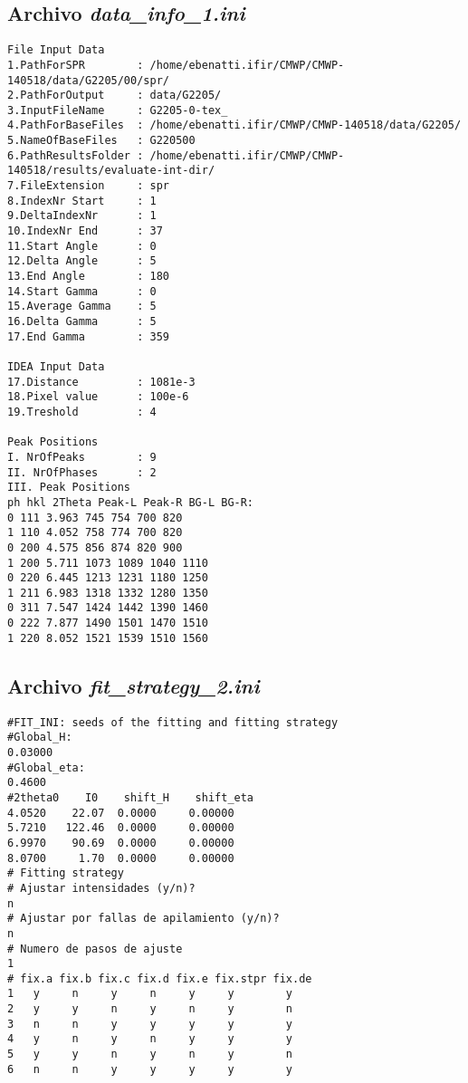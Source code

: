 \subsection{Archivo \textit{data\_info\_1.ini}}
\begin{lstlisting}
File Input Data
1.PathForSPR        : /home/ebenatti.ifir/CMWP/CMWP-140518/data/G2205/00/spr/
2.PathForOutput     : data/G2205/
3.InputFileName     : G2205-0-tex_
4.PathForBaseFiles  : /home/ebenatti.ifir/CMWP/CMWP-140518/data/G2205/
5.NameOfBaseFiles   : G220500
6.PathResultsFolder : /home/ebenatti.ifir/CMWP/CMWP-140518/results/evaluate-int-dir/
7.FileExtension     : spr
8.IndexNr Start     : 1
9.DeltaIndexNr      : 1
10.IndexNr End      : 37
11.Start Angle      : 0
12.Delta Angle      : 5
13.End Angle        : 180
14.Start Gamma      : 0
15.Average Gamma    : 5
16.Delta Gamma      : 5
17.End Gamma        : 359

IDEA Input Data
17.Distance         : 1081e-3
18.Pixel value      : 100e-6
19.Treshold         : 4

Peak Positions
I. NrOfPeaks        : 9
II. NrOfPhases      : 2
III. Peak Positions
ph hkl 2Theta Peak-L Peak-R BG-L BG-R:
0 111 3.963 745 754 700 820
1 110 4.052 758 774 700 820
0 200 4.575 856 874 820 900
1 200 5.711 1073 1089 1040 1110
0 220 6.445 1213 1231 1180 1250
1 211 6.983 1318 1332 1280 1350
0 311 7.547 1424 1442 1390 1460
0 222 7.877 1490 1501 1470 1510
1 220 8.052 1521 1539 1510 1560
\end{lstlisting}

\subsection{Archivo \textit{fit\_strategy\_2.ini}}
\begin{lstlisting}
#FIT_INI: seeds of the fitting and fitting strategy
#Global_H:
0.03000   
#Global_eta:
0.4600     
#2theta0    I0    shift_H    shift_eta
4.0520    22.07  0.0000     0.00000 
5.7210   122.46  0.0000     0.00000
6.9970    90.69  0.0000     0.00000
8.0700     1.70  0.0000     0.00000
# Fitting strategy
# Ajustar intensidades (y/n)?
n
# Ajustar por fallas de apilamiento (y/n)?
n
# Numero de pasos de ajuste
1
# fix.a fix.b fix.c fix.d fix.e fix.stpr fix.de
1   y     n     y     n     y     y        y
2   y     y     n     y     n     y        n
3   n     n     y     y     y     y        y
4   y     n     y     n     y     y        y
5   y     y     n     y     n     y        n
6   n     n     y     y     y     y        y
\end{lstlisting}

